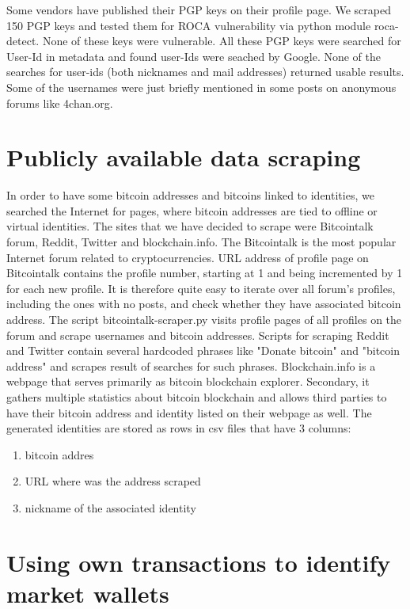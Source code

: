 \documentclass[
  digital, %
  table,   %
  lof,     %
  lot,     %
  oneside
]{fithesis3}
\begin{document}
Some vendors have published their PGP keys on their profile page.
We scraped 150 PGP keys and tested them for ROCA vulnerability via python module roca-detect. None of these keys were vulnerable.
All these PGP keys were searched for User-Id in metadata and found user-Ids were seached by Google.
None of the searches for user-ids (both nicknames and mail addresses) returned usable results.
Some of the usernames were just briefly mentioned in some posts on anonymous forums like 4chan.org.

\section{Publicly available data scraping}
\label{Publicly available data scraping}

In order to have some bitcoin addresses and bitcoins linked to identities,
we searched the Internet for pages, where bitcoin addresses are tied to offline or virtual identities.
The sites that we have decided to scrape were Bitcointalk forum, Reddit, Twitter and blockchain.info.
The Bitcointalk is the most popular Internet forum
related to cryptocurrencies. URL address of profile page on Bitcointalk
contains the profile number, starting at 1 and being incremented by 1
for each new profile. It is therefore quite easy to iterate over all forum's profiles,
including the ones with no posts, and check whether they have associated bitcoin address.
The script bitcointalk-scraper.py visits profile pages of all profiles on the forum and scrape usernames and bitcoin addresses. 
Scripts for scraping Reddit and Twitter contain several hardcoded phrases like "Donate bitcoin" and "bitcoin address" and scrapes 
result of searches for such phrases.
Blockchain.info is a webpage that serves primarily as bitcoin blockchain explorer. Secondary,
it gathers multiple statistics about bitcoin blockchain and allows
third parties to have their bitcoin address and identity listed on their webpage as well.
The generated identities are stored as rows in csv files that have 3 columns:

\begin{enumerate}
 \item bitcoin addres
 \item URL where was the address scraped
 \item nickname of the associated identity
\end{enumerate}

\section{Using own transactions to identify market wallets}
\label{Using own transactions to identify market wallets}
\end{document}
